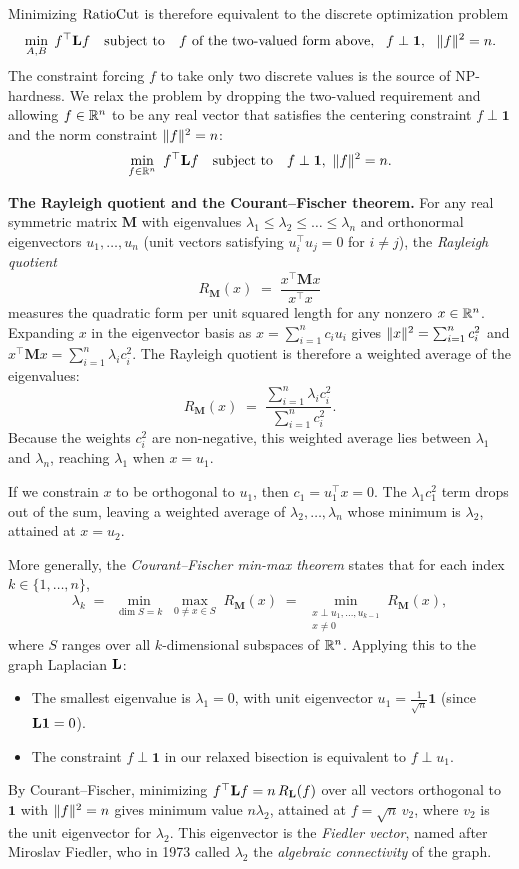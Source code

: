 Minimizing $\operatorname{RatioCut}$ is therefore equivalent to the discrete optimization problem
\[
  \min_{A,B}\; f^\top \mathbf{L} f
  \quad\text{subject to}\quad
  f \text{ of the two-valued form above},\ \ f\perp\mathbf 1,\ \ \lVert f\rVert^2=n.
\]
The constraint forcing $f$ to take only two discrete values is the source of NP-hardness.
We relax the problem by dropping the two-valued requirement and allowing $f\in\mathbb{R}^n$ to be any real vector that satisfies the centering constraint $f\perp\mathbf 1$ and the norm constraint $\lVert f\rVert^2 = n$:
\[
  \min_{f\in\mathbb{R}^n}\ f^\top\mathbf{L} f
  \quad\text{subject to}\quad f\perp\mathbf 1,\ \lVert f\rVert^2 = n.
\]

\begin{whybox}
\textbf{The Rayleigh quotient and the Courant--Fischer theorem.}
For any real symmetric matrix $\mathbf{M}$ with eigenvalues $\lambda_1 \le \lambda_2 \le \dots \le \lambda_n$
and orthonormal eigenvectors $u_1, \dots, u_n$ (unit vectors satisfying $u_i^\top u_j = 0$ for $i\ne j$), the \emph{Rayleigh quotient}
\[
  R_{\mathbf{M}}(x) \;=\; \frac{x^\top \mathbf{M} x}{x^\top x}
\]
measures the quadratic form per unit squared length for any nonzero $x \in \mathbb{R}^n$. Expanding $x$ in the eigenvector basis as
$x = \sum_{i=1}^n c_i u_i$ gives $\lVert x\rVert^2 = \sum_{i=1}^n c_i^2$ and $x^\top \mathbf{M} x = \sum_{i=1}^n \lambda_i c_i^2$.
The Rayleigh quotient is therefore a weighted average of the eigenvalues:
\[
  R_{\mathbf{M}}(x) \;=\; \frac{\sum_{i=1}^n \lambda_i c_i^2}{\sum_{i=1}^n c_i^2}.
\]
Because the weights $c_i^2$ are non-negative, this weighted average lies between $\lambda_1$ and $\lambda_n$, reaching $\lambda_1$ when $x = u_1$.

If we constrain $x$ to be orthogonal to $u_1$, then $c_1 = u_1^\top x = 0$. The $\lambda_1 c_1^2$ term drops out of the sum, leaving a weighted average of $\lambda_2, \dots, \lambda_n$ whose minimum is $\lambda_2$, attained at $x = u_2$.

More generally, the \emph{Courant--Fischer min-max theorem} states that for each index $k \in \{1,\dots,n\}$,
\[
  \lambda_k \;=\; \min_{\dim S = k}\; \max_{0\ne x\in S}\; R_{\mathbf{M}}(x)
  \;=\; \min_{\substack{x \perp u_1, \dots, u_{k-1} \\ x\ne 0}} R_{\mathbf{M}}(x),
\]
where $S$ ranges over all $k$-dimensional subspaces of $\mathbb{R}^n$. Applying this to the graph Laplacian $\mathbf{L}$:
\begin{itemize}
  \item The smallest eigenvalue is $\lambda_1 = 0$, with unit eigenvector $u_1 = \frac{1}{\sqrt{n}}\mathbf{1}$
        (since $\mathbf{L} \mathbf{1} = 0$).
  \item The constraint $f \perp \mathbf{1}$ in our relaxed bisection is equivalent to $f \perp u_1$.
\end{itemize}
By Courant--Fischer, minimizing $f^\top \mathbf{L} f = n\,R_{\mathbf{L}}(f)$ over all vectors orthogonal to $\mathbf{1}$ with $\lVert f\rVert^2 = n$
gives minimum value $n \lambda_2$, attained at $f = \sqrt{n}\,v_2$, where $v_2$ is the unit eigenvector for $\lambda_2$. This eigenvector is
the \emph{Fiedler vector}, named after Miroslav Fiedler, who in 1973 called $\lambda_2$ the
\emph{algebraic connectivity} of the graph.
\end{whybox}

